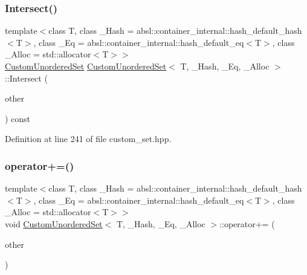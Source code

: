 \subsubsection{\texorpdfstring{Intersect()}{Intersect()}}
{\footnotesize\ttfamily template$<$class T, class \+\_\+\+Hash = absl\+::container\+\_\+internal\+::hash\+\_\+default\+\_\+hash$<$\+T$>$, class \+\_\+\+Eq = absl\+::container\+\_\+internal\+::hash\+\_\+default\+\_\+eq$<$\+T$>$, class \+\_\+\+Alloc = std\+::allocator$<$\+T$>$$>$ \\
\hyperlink{classCustomUnorderedSet}{Custom\+Unordered\+Set} \hyperlink{classCustomUnorderedSet}{Custom\+Unordered\+Set}$<$ T, \+\_\+\+Hash, \+\_\+\+Eq, \+\_\+\+Alloc $>$\+::Intersect (\begin{DoxyParamCaption}\item[{const \hyperlink{classCustomUnorderedSet}{Custom\+Unordered\+Set}$<$ T, \+\_\+\+Hash, \+\_\+\+Eq, \+\_\+\+Alloc $>$ \&}]{other }\end{DoxyParamCaption}) const\hspace{0.3cm}{\ttfamily [inline]}}



Definition at line 241 of file custom\+\_\+set.\+hpp.

\mbox{\label{classCustomUnorderedSet_a74c13a391ad5c035a30d168889f5bb94}} 
\subsubsection{\texorpdfstring{operator+=()}{operator+=()}}
{\footnotesize\ttfamily template$<$class T, class \+\_\+\+Hash = absl\+::container\+\_\+internal\+::hash\+\_\+default\+\_\+hash$<$\+T$>$, class \+\_\+\+Eq = absl\+::container\+\_\+internal\+::hash\+\_\+default\+\_\+eq$<$\+T$>$, class \+\_\+\+Alloc = std\+::allocator$<$\+T$>$$>$ \\
void \hyperlink{classCustomUnorderedSet}{Custom\+Unordered\+Set}$<$ T, \+\_\+\+Hash, \+\_\+\+Eq, \+\_\+\+Alloc $>$\+::operator+= (\begin{DoxyParamCaption}\item[{const \hyperlink{classCustomUnorderedSet}{Custom\+Unordered\+Set}$<$ T, \+\_\+\+Hash, \+\_\+\+Eq, \+\_\+\+Alloc $>$ \&}]{other }\end{DoxyParamCaption})\hspace{0.3cm}{\ttfamily [inline]}}



